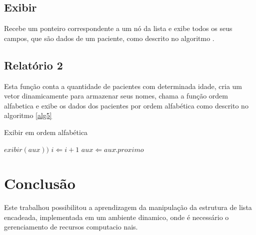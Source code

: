\documentclass[12pt]{article}
\begin{document}
\subsection{Exibir}

Recebe um ponteiro correspondente a um nó da lista e exibe todos os seus campos,
que são dados de um paciente, como descrito no algoritmo .


\subsection{Relatório 2}

Esta função conta a quantidade de pacientes com determinada idade, cria um vetor dinamicamente
para armazenar seus nomes, chama a função ordem alfabetica e exibe os dados dos pacientes por ordem
alfabética como descrito no algoritmo \ref{alg5}

\begin{algorithm}                      %
\caption{Exibir em ordem alfabética}          %
\label{alg5}                           %
\begin{algorithmic}
            \STATE $exibir(aux))$
            \STATE $i \Leftarrow i+1$
          \ENDIF
      \ENDWHILE
      \STATE $aux \Leftarrow aux\hat.proximo$
  \ENDWHILE
\end{algorithmic}
\end{algorithm}  



\section{Conclusão}

Este trabalhou possibilitou a aprendizagem da manipulação da estrutura de lista encadeada,
implementada em um ambiente dinamico, onde é necessário o gerenciamento de recursos computacio
nais.



\end{document}

